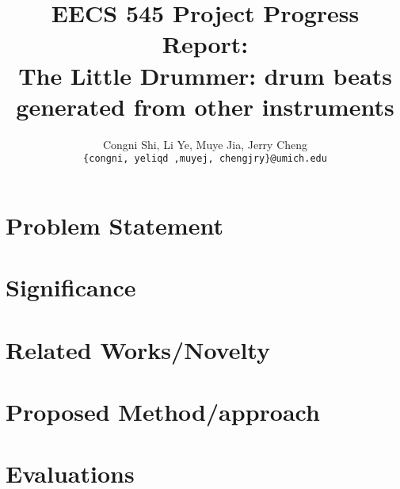 \documentclass[11pt,letterpaper]{article}
\title{EECS 545 Project Progress Report: \\

        The Little Drummer: drum beats generated from other instruments}
\author{Congni Shi, Li Ye, Muye Jia, Jerry Cheng\\

        \texttt{\{congni, yeliqd ,muyej, chengjry\}@umich.edu}

}
\begin{document}
\maketitle

\section{Problem Statement}
    \label{sec:problem}
    
\section{Significance}
    \label{sec:significance}
    
\section{Related Works/Novelty}
    \label{sec:novelty}
    
\section{Proposed Method/approach}
    \label{sec:approach}
    

\section{Evaluations}
    \label{sec:eval}


\nocite{*}

\end{document}
